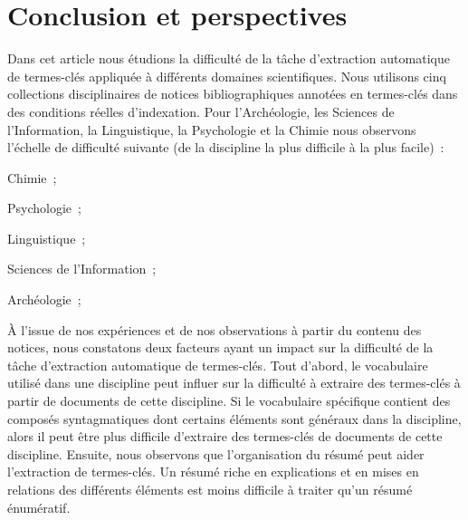 \section{Conclusion et perspectives}
\label{sec:conclusion_et_perspectives}
  Dans cet article nous étudions la difficulté de la tâche d'extraction
  automatique de termes-clés appliquée à différents domaines scientifiques. Nous
  utilisons cinq collections disciplinaires de notices bibliographiques annotées
  en termes-clés dans des conditions réelles d'indexation. Pour l'Archéologie,
  les Sciences de l'Information, la Linguistique, la Psychologie et la Chimie
  nous observons l'échelle de difficulté suivante (de la discipline la plus
  difficile à la plus facile)~:
  \begin{enumerate*}
    \item{Chimie~;}
    \item{Psychologie~;}
    \item{Linguistique~;}
    \item{Sciences de l'Information~;}
    \item{Archéologie~;}
  \end{enumerate*}

  À l'issue de nos expériences et de nos observations à partir du contenu des
  notices, nous constatons deux facteurs ayant un impact sur la difficulté de la
  tâche d'extraction automatique de termes-clés. Tout d'abord, le vocabulaire
  utilisé dans une discipline peut influer sur la difficulté à extraire des
  termes-clés à partir de documents de cette discipline. Si le vocabulaire
  spécifique contient des composés syntagmatiques dont certains éléments sont
  généraux dans la discipline, alors il peut être plus difficile
  d'extraire des termes-clés de documents de cette discipline. Ensuite, nous
  observons que l'organisation du résumé peut aider l'extraction de termes-clés.
  Un résumé riche en explications et en mises en relations des différents
  éléments est moins difficile à traiter qu'un résumé énumératif.

